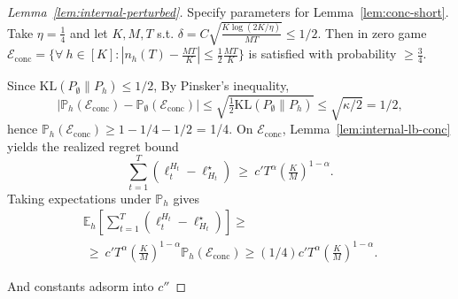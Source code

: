 \documentclass[a4paper,14pt]{extarticle}
\theoremstyle{plain}
\begin{document}
\begin{proof}[Lemma~\ref{lem:internal-perturbed}]
Specify parameters for Lemma~\ref{lem:conc-short}.
Take $\eta = \frac{1}{4}$ and let $K,M, T$ s.t. $\delta = C\sqrt{\frac{K\log(2K/\eta)}{MT}}\le 1/2$. Then in zero game $\mathcal E_{\mathrm{conc}} = \{\forall~h \in[K]: |n_h(T) - \frac{MT}{K}|\le \frac{1}{2} \frac{MT}{K}\}$ is satisfied with probability $\ge \frac{3}{4}$.

Since $\mathrm{KL}(P_\emptyset\|P_h) \le 1/2$, By Pinsker’s inequality,
\begin{equation}
\bigl|\mathbb P_h(\mathcal E_{\mathrm{conc}})-\mathbb P_\emptyset(\mathcal E_{\mathrm{conc}})\bigr|
\le \sqrt{\tfrac12\mathrm{KL}(P_\emptyset\|P_h)}
\le \sqrt{\kappa/2} = 1/2,
\end{equation}
hence $\mathbb P_h(\mathcal E_{\mathrm{conc}})\ge 1-1/4-1/2$ = 1/4. On $\mathcal E_{\mathrm{conc}}$, Lemma~\ref{lem:internal-lb-conc} yields the realized regret bound
\begin{equation*}
\sum_{t=1}^T (\ell_t^{H_t} - \ell_{H_t}^\star )
\ \ge\ c'T^{\alpha}\!\left(\tfrac{K}{M}\right)^{1-\alpha}.
\end{equation*}
Taking expectations under $\mathbb P_h$ gives
\begin{multline*}
\mathbb E_h\!\left[\sum_{t=1}^T (\ell_t^{H_t} - \ell_{H_t}^\star)\right] \ge\\
\ \ge\ c'T^{\alpha}\!\left(\tfrac{K}{M}\right)^{1-\alpha}
\mathbb P_h(\mathcal E_{\mathrm{conc}})
\ge (1/4)c'T^{\alpha}\!\left(\tfrac{K}{M}\right)^{1-\alpha}.
\end{multline*}

And constants adsorm into $c''$
\end{proof}
\end{document}
